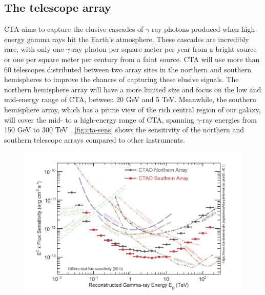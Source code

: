 \subsection{The telescope array}
\label{ss:telescope-array}
CTA aims to capture the elusive cascades of $\gamma$-ray photons produced when high-energy gamma rays hit the Earth's atmosphere. These cascades are incredibly rare, with only one $\gamma$-ray photon per square meter per year from a bright source or one per square meter per century from a faint source. CTA will use more than 60 telescopes distributed between two array sites in the northern and southern hemispheres to improve the chances of capturing these elusive signals. The northern hemisphere array will have a more limited size and focus on the low and mid-energy range of CTA, between 20 GeV and 5 TeV. Meanwhile, the southern hemisphere array, which has a prime view of the rich central region of our galaxy, will cover the mid- to a high-energy range of CTA, spanning $\gamma$-ray energies from 150 GeV to 300 TeV \cite{Acharyya201935}. \autoref{fig:cta-sens} shows the sensitivity of the northern and southern telescope arrays compared to other instruments. 
\begin{figure}[]
\centering
\includegraphics[width=1\linewidth]{figures/introduction/ctao-sensitivity.png}
\label{fig:ctao-sens}
\end{figure}
